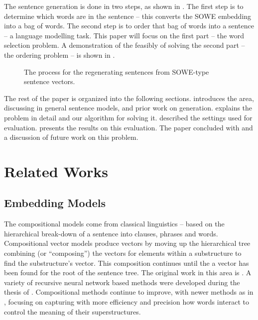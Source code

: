 \documentclass[11pt]{article}
\theoremstyle{plain}
\theoremstyle{definition}
\begin{document}
The sentence generation is done in two steps, as shown in . The first step is to determine which words are in the sentence -- this converts the SOWE embedding into a bag of words. The second step is to order that bag of words into a sentence -- a language modelling task. This paper will focus on the first part -- the word selection problem. A demonstration of the feasibly of solving the second part -- the ordering problem --  is shown in .

\begin{figure}
	\centering 
	
	\caption{The process for the regenerating sentences from SOWE-type sentence vectors. }
	\label{block_diagram}
\end{figure}

The rest of the paper is organized into the following sections.  introduces the area, discussing in general sentence models, and prior work on generation.  explains the problem in detail and our algorithm for solving it.  described the settings used for evaluation.  presents the results on this evaluation. The paper concluded with  and a discussion of future work on this problem.


\section{Related Works}\label{relwork}
\subsection{Embedding Models}



The compositional models come from classical linguistics -- based on the hierarchical  break-down of a sentence into clauses, phrases and words. Compositional vector models produce vectors by moving up the hierarchical tree combining (or ``composing'') the vectors for elements within a substructure to find the substructure's vector. This composition continues until the a vector has been found for the root of the sentence tree. The original work in this area is \textcite{Mitchell2008}. A variety of recursive neural network based methods were developed during the thesis of \textcite{socher2014recursive}. Compositional methods continue to improve, with newer methods as in \textcite{TACL15CompVector}, focusing on capturing with more efficiency and precision how words interact to control the meaning of their superstructures. 
\end{document}
